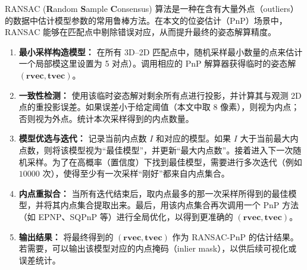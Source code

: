 RANSAC (\textbf{R}andom \textbf{S}ample \textbf{C}onsensus) 算法是一种在含有大量外点（outliers）的数据中估计模型参数的常用鲁棒方法。在本文的位姿估计（PnP）场景中，RANSAC 能够在匹配点中剔除错误对应，从而提升最终的姿态解算精度。

\begin{enumerate}
	\item \textbf{最小采样构造模型：}  
	在所有 3D--2D 匹配点中，随机采样最小数量的点来估计一个局部模这里设置为 5 对点）。调用相应的 PnP 解算器获得临时的姿态解 $(\mathbf{rvec}, \mathbf{tvec})$。
	
	\item \textbf{一致性检测：}  
	使用该临时姿态解对剩余所有点进行投影，并计算其与观测 2D 点的重投影误差。如果误差小于给定阈值（本文中取 $8$ 像素），则视为内点；否则视为外点。统计本次采样得到的内点数量。
	
	\item \textbf{模型优选与迭代：}  
	记录当前内点数 $I$ 和对应的模型。如果 $I$ 大于当前最大内点数，则将该模型视为“最佳模型”，并更新“最大内点数”。接着进入下一次随机采样。为了在高概率（置信度）下找到最佳模型，需要进行多次迭代（例如 $10000$ 次），使得至少有一次采样“刚好”都来自内点集合。
	
	\item \textbf{内点重拟合：}  
	当所有迭代结束后，取内点最多的那一次采样所得到的最佳模型，并将其内点集合提取出来。最后，用该内点集合再次调用一个 PnP 方法（如 EPNP、SQPnP 等）进行全局优化，以得到更准确的 $(\mathbf{rvec}, \mathbf{tvec})$。
	
	\item \textbf{输出结果：}  
	将最终得到的 $(\mathbf{rvec}, \mathbf{tvec})$ 作为 RANSAC-PnP 的估计结果。若需要，可以输出该模型对应的内点掩码（inlier mask），以供后续可视化或误差统计。
\end{enumerate}

